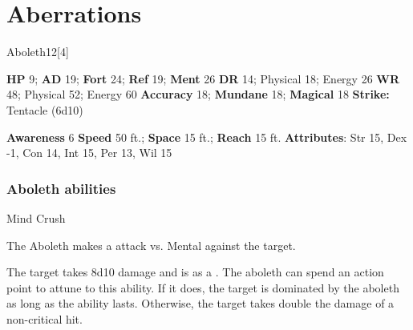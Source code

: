 
        \section{Aberrations}
      
  \begin{monsection}{Aboleth}{12}[4]
    \vspace{-1em}\vspace{-1em}
    \begin{spellcontent}
      \begin{spelltargetinginfo}
        \pari \textbf{HP} 9;
          \textbf{AD} 19;
          \textbf{Fort} 24;
          \textbf{Ref} 19;
          \textbf{Ment} 26
        \pari \textbf{DR} 14; Physical 18; Energy 26
        \pari \textbf{WR} 48; Physical 52; Energy 60
        \pari \textbf{Accuracy} 18;
          \textbf{Mundane} 18;
          \textbf{Magical} 18
        \pari \textbf{Strike:}
            Tentacle  (6d10)
      \end{spelltargetinginfo}
    \end{spellcontent}
    \begin{monsterfooter}
      \pari \textbf{Awareness} 6
      \pari \textbf{Speed} 50 ft.;
        \textbf{Space} 15 ft.;
        \textbf{Reach} 15 ft.
      \pari \textbf{Attributes}:
        Str 15, Dex -1, Con 14,
        Int 15, Per 13, Wil 15
    \end{monsterfooter}
  \end{monsection}
  \subsubsection{Aboleth abilities}
        
    \begin{freeability}{Mind Crush}
      
    
      The Aboleth makes a  attack
        vs. Mental against the target.
    
    \hit The target takes 8d10  damage and is  as a .
    \crit 
          The aboleth can spend an action point to attune to this ability.
          If it does, the target is dominated by the aboleth as long as the ability lasts.
          Otherwise, the target takes double the damage of a non-critical hit.
        
  
    \end{freeability}
  

